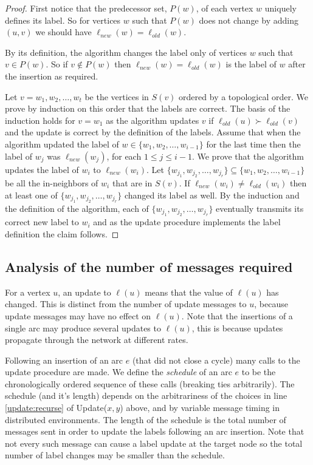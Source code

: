 \documentclass[11pt]{article}
\theoremstyle{plain}
\theoremstyle{definition}
\theoremstyle{remark}
\numberwithin{equation}{section}
\DeclareMathOperator{\llex}{\succ}
\begin{document}
\begin{proof}
First notice that the predecessor set, $P(w)$, of each vertex $w$
uniquely defines its label. So for vertices $w$ such that $P(w)$
does not change by adding $(u,v)$ we should have
$\ell_{new}(w)=\ell_{old}(w)$.

By its definition, the algorithm changes the label only of vertices
$w$ such that $v\in P(w)$. So if  $v\not\in P(w)$ then
$\ell_{new}(w)=\ell_{old}(w)$ is the label of $w$ after the
insertion as required.


Let $v=w_1,w_2,\ldots, w_t$ be the vertices in $S(v)$ ordered by a
topological order. We prove by induction on this order that the
labels are correct. The basis of the induction holds for $v=w_1$ as
the algorithm updates $v$ if $\ell_{old}(u)\llex \ell_{old}(v)$ and
the update is correct by the definition of the labels. Assume that
when the algorithm updated the label  of $w\in \{ w_1,w_2,\ldots,
w_{i-1}\}$ for the last time then the label of $w_j$ was
$\ell_{new}(w_j)$, for each $1\le j\le i-1$. We prove that the
algorithm updates the label of $w_i$ to $\ell_{new}(w_i)$. Let
$\{w_{j_1},w_{j_2},\ldots, w_{j_r}\}\subseteq \{ w_1,w_2,\ldots,
w_{i-1}\}$ be all the in-neighbors of $w_i$ that are in $S(v)$. If
$\ell_{new}(w_i)\not= \ell_{old}(w_i)$  then  at least one of
$\{w_{j_1},w_{j_2},\ldots, w_{j_r}\}$ changed its label as well. By
the induction and the definition of the algorithm, each of
$\{w_{j_1},w_{j_2},\ldots, w_{j_r}\}$  eventually transmits its
correct new label to $w_i$ and as the update  procedure implements
the label definition the claim follows.

\end{proof}


\subsection{Analysis of the number of messages required}
\label{sec:analysis}

For a vertex $u$, an update to $\ell(u)$ means that the value of
$\ell(u)$ has changed. This is distinct from the number of update
messages to $u$, because update messages may have no effect on
$\ell(u)$. Note that the insertions of a single arc may produce
several updates to $\ell(u)$, this is because updates propagate
through the network at different rates.

Following an insertion of an arc $e$ (that did not close a cycle)
many calls to the update procedure are made. We define the {\em
schedule} of an arc $e$ to be the chronologically ordered sequence
of these calls (breaking ties arbitrarily). The schedule (and it's
length) depends on the arbitrariness of the choices in line
\ref{update:recurse} of Update($x,y$) above, and by variable message
timing in distributed environments. The length of the schedule is
the total number of messages sent in order to update the labels
following an arc insertion. Note that not every such message can
cause a label update at the target node so the total number of label
changes may be smaller than the schedule.
\end{document}
